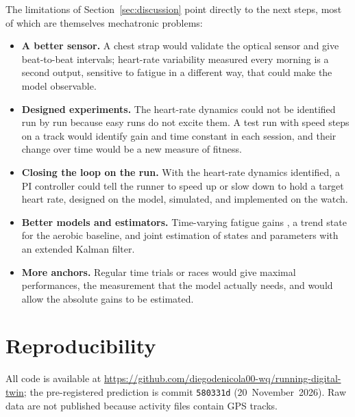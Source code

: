 \documentclass[11pt,a4paper]{article}
\begin{document}
The limitations of Section~\ref{sec:discussion} point directly to the next steps,
most of which are themselves mechatronic problems:
\begin{itemize}
\item \textbf{A better sensor.} A chest strap would validate the optical sensor and
give beat-to-beat intervals; heart-rate variability measured every morning is a
second output, sensitive to fatigue in a different way, that could make the model
observable.
\item \textbf{Designed experiments.} The heart-rate dynamics could not be identified
run by run because easy runs do not excite them. A test run with speed steps on a
track would identify gain and time constant in each session, and their change
over time would be a new measure of fitness.
\item \textbf{Closing the loop on the run.} With the heart-rate dynamics identified,
a PI controller could tell the runner to speed up or slow down to hold a target
heart rate, designed on the model, simulated, and implemented on the watch.
\item \textbf{Better models and estimators.} Time-varying fatigue gains
\citep{busso2003}, a trend state for the aerobic baseline, and joint estimation of
states and parameters with an extended Kalman filter.
\item \textbf{More anchors.} Regular time trials or races would give maximal
performances, the measurement that the model actually needs, and would allow the
absolute gains to be estimated.
\end{itemize}

\section*{Reproducibility}
All code is available at \url{https://github.com/diegodenicola00-wq/running-digital-twin}; the pre-registered prediction is commit \texttt{580331d} (20~November~2026). Raw data are not published
because activity files contain GPS tracks.



\end{document}
